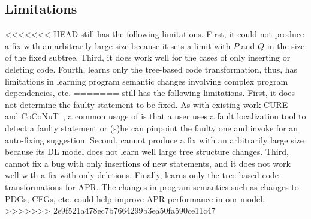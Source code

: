 \subsection{Limitations}
\label{sec:limitations}

<<<<<<< HEAD
{\tool} still has the following limitations. 
First, it could not produce a fix with an
arbitrarily large size because it sets a limit with $P$ and $Q$ in the
size of the fixed subtree. Third, it does work well for the cases of
only inserting or deleting code. Fourth, {\tool} learns only the
tree-based code transformation, thus, has limitations in learning
program semantic changes involving complex program dependencies, etc.
=======
{\tool} still has the following limitations. First, it does not
determine the faulty statement to be fixed. As with existing work
CURE~\cite{cure-icse21} and CoCoNuT~\cite{lutellier2020coconut}, a
common usage of {\tool} is that a user uses a fault localization tool
to detect a faulty statement or (s)he can pinpoint the faulty one and
invoke {\tool} for an auto-fixing suggestion. Second, {\tool} cannot
produce a fix with an arbitrarily large size because its DL model does
not learn well large tree structure changes. Third, {\tool} cannot fix
a bug with only insertions of new statements, and it does not work
well with a fix with only deletions.
Finally, {\tool} learns only the tree-based code transformations for
APR. The changes in program semantics such as changes to PDGs, CFGs,
etc. could help improve APR performance in our model.
>>>>>>> 2e9f521a478ec7b7664299b3ea50fa590ce11c47
